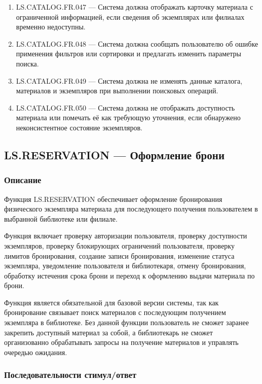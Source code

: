 \documentclass[12pt,a4paper]{article}
\begin{document}
\begin{enumerate}
		\item LS.CATALOG.FR.047 --- Система должна отображать карточку материала
		с ограниченной информацией, если сведения об экземплярах или филиалах временно
		недоступны.
		
		\item LS.CATALOG.FR.048 --- Система должна сообщать пользователю об ошибке
		применения фильтров или сортировки и предлагать изменить параметры поиска.
		
		\item LS.CATALOG.FR.049 --- Система должна не изменять данные каталога,
		материалов и экземпляров при выполнении поисковых операций.
		
		\item LS.CATALOG.FR.050 --- Система должна не отображать доступность материала
		или помечать её как требующую уточнения, если обнаружено неконсистентное
		состояние экземпляров.
	\end{enumerate}
	
	\subsection{LS.RESERVATION --- Оформление брони}
	
	\subsubsection{Описание}
	
	Функция LS.RESERVATION обеспечивает оформление бронирования физического
	экземпляра материала для последующего получения пользователем в выбранной
	библиотеке или филиале.
	
	Функция включает проверку авторизации пользователя, проверку доступности
	экземпляров, проверку блокирующих ограничений пользователя, проверку лимитов
	бронирования, создание записи бронирования, изменение статуса экземпляра,
	уведомление пользователя и библиотекаря, отмену бронирования, обработку
	истечения срока брони и переход к оформлению выдачи материала по брони.
	
	Функция является обязательной для базовой версии системы, так как бронирование
	связывает поиск материалов с последующим получением экземпляра в библиотеке.
	Без данной функции пользователь не сможет заранее закрепить доступный материал
	за собой, а библиотекарь не сможет организованно обрабатывать запросы на получение
	материалов и управлять очередью ожидания.
	
	\subsubsection{Последовательности стимул/ответ}
	
\end{document}

